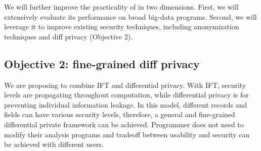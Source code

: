 















 We will further improve the practicality of \kakute in two 
dimensions. First, we will extensively evaluate its performance on broad 
big-data programs. Second, we will leverage it to improve existing security 
techniques, including anonymization techniques and diff privacy (Objective 2). 

\vspace{-.15in}\subsection{Objective 2: 
fine-grained diff privacy}\label{sec:obj2}\vspace{-.075in}

We are proposing
to combine IFT and differential privacy. With IFT, security levels are 
propagating
throughout computation, while differential privacy is for preventing individual 
information leakage.
In this model, different records and fields can have various security levels,
therefore, a general and fine-grained differential private framework can be 
achieved.
Programmer does not need to modify their analysis programs and tradeoff between
usability and security can be achieved with different users.

